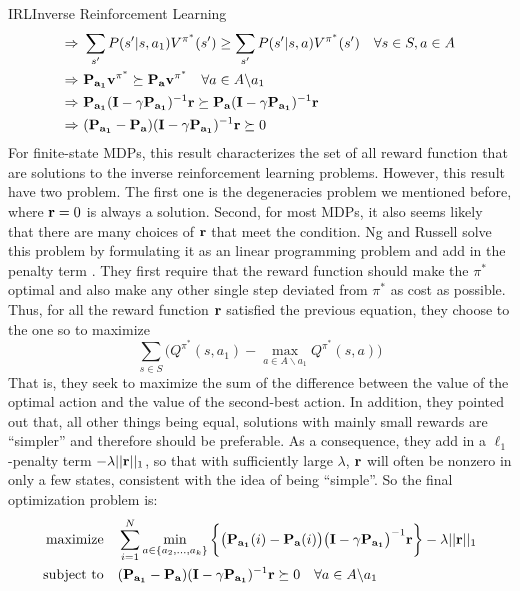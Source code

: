 \documentclass[9pt]{article}
\begin{document}
\begin{topic}{IRL}{Inverse Reinforcement Learning}
\begin{equation}
\begin{split}
\Rightarrow &\ \sum_{s'} P(s'|s,a_1) V^{\pi^*}(s') \ge \sum_{s'} P(s'|s,a) V^{\pi^*}(s') \quad \forall s \in S, a\in A\\
\Rightarrow &\ \mathbf{P_{a_1}}  \mathbf{v^{\pi^*}} \succeq  \mathbf{P_a}  \mathbf{v^{\pi^*}}  \quad \forall a\in A \backslash a_1\\
\Rightarrow &\ \mathbf{P_{a_1}}(\mathbf{I} - \gamma\mathbf{P_{a_1}})^{-1} \mathbf{r} \succeq \mathbf{P_{a}}(\mathbf{I} - \gamma\mathbf{P_{a_1}})^{-1} \mathbf{r}\\
\Rightarrow &\ (\mathbf{P_{a_1}} - \mathbf{P_{a}})(\mathbf{I} - \gamma\mathbf{P_{a_1}})^{-1}\mathbf{r} \succeq 0
\end{split}
\end{equation}
For finite-state MDPs, this result characterizes the set of all reward function that  are solutions to the inverse reinforcement learning problems. However, this result have two problem. The first one is the degeneracies problem we mentioned before, where $\mathbf{r} = 0$ is always a solution. Second, for most MDPs, it also seems likely that there are many choices of $\mathbf{r}$ that meet the condition.  Ng and Russell solve this problem by formulating it as an linear programming problem and add in the penalty term \citep{Ng2000Algorithms}. They first require that the reward function should make the $\pi^*$ optimal and also make any other single step deviated from $\pi^*$ as cost as possible. Thus, for all the reward function $\mathbf{r}$ satisfied the previous equation, they choose to the one so to maximize
\[
\sum_{s\in S} \bigg(Q^{\pi^*}(s, a_1) - \max_{a\in A\backslash a_1}Q^{\pi^*}(s,a)\bigg)
\]
That is, they seek to maximize the sum of the difference between  the value of the optimal action and the value of the second-best action. In addition, they pointed out that, all other things being equal, solutions with mainly small rewards are ``simpler'' and therefore should be preferable. As a consequence, they add in a $\ell_1$-penalty term $-\lambda||\mathbf{r}||_1$, so that with sufficiently large $\lambda$, $\mathbf{r}$ will often be nonzero in only a few states, consistent with the idea of being ``simple''. So the final optimization problem is:
\[
\begin{split}
\text{maximize} & \quad \sum_{i=1}^{N} \min_{a\in \{a_2,\ldots,a_k\}}\bigg\{ \big(\mat{P_{a_1}}(i)-\mat{P_{a}}(i)\big)\big(\mat{I} - \gamma\mat{P_{a_1}}\big)^{-1}\mat{r} \bigg\}-\lambda ||\mat{r}||_1\\
\text{subject to} & \quad (\mat{P_{a_1}} - \mat{P_{a}})(\mat{I} - \gamma\mat{P_{a_1}})^{-1}\mat{r}  \succeq 0 \quad \forall a \in A \backslash a_1\\

\end{split}\]
\end{topic}
\end{document}
